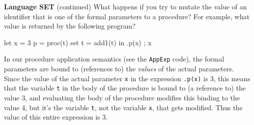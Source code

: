 \begin{minipage}[t]{\sw}
\slidenumber
\LARGE
{\bf Language SET} (continued)\exx
What happens if you try to mutate the value
of an identifier that is one of the formal parameters
to a procedure?
For example, what value is returned by the following program?
\begin{qv}
let
  x = 3
  p = proc(t) set t = add1(t)
in
  { .p(x) ; x }
\end{qv}
In our procedure application semantics
(see the \verb'AppExp' code),
the formal parameters are bound
to (references to) the {\em values} of the actual parameters.
Since the value of the actual parameter \verb'x'
in the expression \verb'.p(x)' is 3,
this means that the variable \verb't' in the body of the procedure
is bound to (a reference to) the value 3,
and evaluating the body of the procedure
modifies this binding to the value 4,
but it's the variable \verb't', not the variable \verb'x',
that gets modified.
Thus the value of this entire expression is 3.
\end{minipage}
\clearpage
